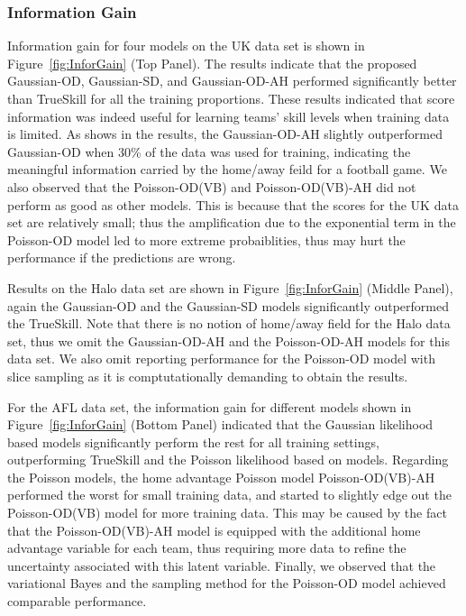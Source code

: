 \subsubsection{Information Gain}
Information gain for four models on the UK data set is shown in Figure~\ref{fig:InforGain} (Top Panel). The results indicate that the proposed Gaussian-OD, Gaussian-SD, and Gaussian-OD-AH performed significantly better than TrueSkill for all the training proportions. These results indicated that score information was  indeed useful for learning teams' skill levels when training data is limited. As shows in the results, the Gaussian-OD-AH slightly outperformed Gaussian-OD when 30\% of the data was used for training, indicating the meaningful information carried by the home/away feild for a football game. We also observed that the Poisson-OD(VB) and Poisson-OD(VB)-AH did not perform as good as other models. This is because that the scores for the UK data set are relatively small; thus the amplification due to the exponential term in the Poisson-OD model led to more extreme probaiblities, thus may hurt the performance if the predictions are wrong.

Results on the Halo data set are shown in Figure~\ref{fig:InforGain} (Middle Panel), again the Gaussian-OD and the Gaussian-SD models significantly outperformed the TrueSkill. Note that there is no notion of home/away field for the Halo data set, thus we omit the Gaussian-OD-AH and the Poisson-OD-AH models for this data set. We also omit reporting performance for the Poisson-OD model with slice sampling as it is comptutationally demanding to obtain the results. 

For the AFL data set, the information gain for different models shown in Figure~\ref{fig:InforGain} (Bottom Panel) indicated that the Gaussian likelihood based models significantly perform the rest for all training settings, outperforming TrueSkill and the Poisson likelihood based on models. Regarding the Poisson models, the home advantage Poisson model Poisson-OD(VB)-AH performed the worst for small training data, and started to slightly edge out the Poisson-OD(VB) model for more training data. This may be caused by the fact that the Poisson-OD(VB)-AH model is equipped with the additional home advantage variable for each team, thus requiring more data to refine the uncertainty associated with this latent variable. Finally, we observed that the variational Bayes and the sampling method for the Poisson-OD model achieved comparable performance. 

